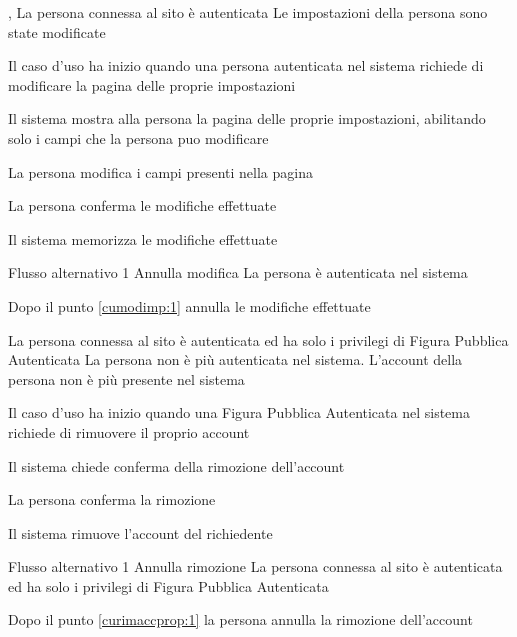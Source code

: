 {, }
{La persona connessa al sito è autenticata}
{Le impostazioni della persona sono state modificate}
{\begin{enumCU}
	\item Il caso d'uso ha inizio quando una persona autenticata nel sistema richiede di modificare la pagina delle proprie impostazioni
	\item Il sistema mostra alla persona la pagina delle proprie impostazioni, abilitando solo i campi che la persona puo modificare
	\item La persona modifica i campi presenti nella pagina  \label{cumodimp:1}
	\item La persona conferma le modifiche effettuate 
	\item Il sistema memorizza le modifiche effettuate
\end{enumCU}}
%
{Flusso alternativo 1}%
{Annulla modifica}%
{La persona è autenticata nel sistema}%
{\postNulle}%
{\begin{enumCU}
		\item Dopo il punto \ref{cumodimp:1} annulla le modifiche effettuate
	\end{enumCU}}%

\tabcuvspace

{}
{La persona connessa al sito è autenticata ed ha solo i privilegi di Figura Pubblica Autenticata}
{La persona non è più autenticata nel sistema. L'account della persona non è più presente nel sistema}
{\begin{enumCU}
	\item Il caso d'uso ha inizio quando una Figura Pubblica Autenticata nel sistema richiede di rimuovere il proprio account
	\item Il sistema chiede conferma della rimozione dell'account \label{curimaccprop:1}
	\item La persona conferma la rimozione
	\item Il sistema rimuove l'account del richiedente
\end{enumCU}}
%
{Flusso alternativo 1}%
{Annulla rimozione}%
{La persona connessa al sito è autenticata ed ha solo i privilegi di Figura Pubblica Autenticata}%
{\postNulle}%
{\begin{enumCU}
		\item Dopo il punto \ref{curimaccprop:1} la persona annulla la rimozione dell'account
	\end{enumCU}}%

